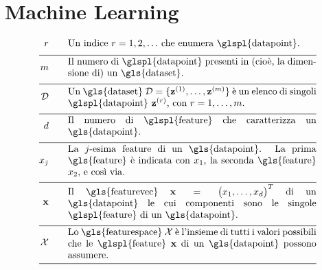\newpage
\section*{Machine Learning}

\begin{align}
	\sampleidx \quad\quad & \parbox{.75\textwidth}{Un indice $\sampleidx=1,2,\ldots$ che enumera \glspl{datapoint}.}   \nonumber \\[2mm] \hline \nonumber\\[-5mm]
	\samplesize \quad\quad &\parbox{.75\textwidth}{Il numero di  \glspl{datapoint} presenti in (cioè, la dimensione di) un \gls{dataset}.} \nonumber \\[2mm] \hline \nonumber\\[-5mm] 
	\dataset \quad\quad & \parbox{.75\textwidth}{Un \gls{dataset} $\dataset = \{ \datapoint^{(1)},\ldots, \datapoint^{(\samplesize)} \}$ 
		è un elenco di singoli \glspl{datapoint} $\datapoint^{(\sampleidx)}$, con $\sampleidx=1,\ldots,\samplesize$.}   \nonumber \\[2mm] \hline \nonumber\\[-5mm]
	\featurelen \quad\quad &\parbox{.75\textwidth}{Il numero di \glspl{feature} che caratterizza un \gls{datapoint}.}\nonumber \\[2mm] \hline \nonumber\\[-5mm]
	\feature_{\featureidx} \quad\quad &\parbox{.75\textwidth}{La $\featureidx$-esima feature di un \gls{datapoint}. La prima \gls{feature} 
		è indicata con $\feature_{1}$, la seconda \gls{feature} $\feature_{2}$, e così via. } \nonumber \\[2mm] \hline \nonumber\\[-5mm] 
	\featurevec \quad\quad &\parbox{.75\textwidth}{Il \gls{featurevec} $\featurevec=\big(\feature_{1},\ldots,\feature_{\featuredim}\big)^{T}$ di un \gls{datapoint} le cui componenti sono le singole \glspl{feature} di un \gls{datapoint}.}\nonumber \\[2mm] \hline \nonumber\\[-5mm]
	\featurespace \quad\quad & \parbox{.75\textwidth}{Lo \gls{featurespace} $\featurespace$ è l'insieme di tutti i valori possibili che le \glspl{feature} $\featurevec$ di un \gls{datapoint} possono assumere.} \nonumber \\[2mm] \hline \nonumber\\[-5mm]

\end{align}
